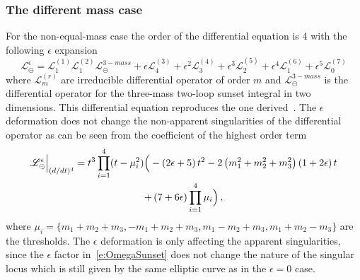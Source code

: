 \documentclass[a4paper,12pt]{article}
\numberwithin{equation}{section}
\numberwithin{figure}{section}
\def\su{\circleddash}
\begin{document}
\subsubsection{The different mass case}\label{sec:2sunset3mass}

For the non-equal-mass case the order of the differential equation is
4 with the following $\epsilon$ expansion
\begin{equation}
     \mathscr{L}^{\epsilon}_\su =   \mathscr{L}^{(1)}_1
     \mathscr{L}^{(2)}_1    \mathscr{L}^{3-mass}_\su +\epsilon
     \mathscr{L}^{(3)}_4+\epsilon^2  \mathscr{L}^{(4)}_3+\epsilon^3
     \mathscr{L}^{(5)}_2+ \epsilon^4 \mathscr{L}^{(6)}_1 +\epsilon^5
    \mathscr{L}^{(7)}_0
   \end{equation} 
   where $ \mathscr{L}^{(r)}_m$  are irreducible differential operator
   of  order $m$ and $\mathscr{L}^{3-mass}_\su$ is the differential
   operator for the three-mass two-loop sunset integral in two
   dimensions. This differential equation reproduces the one 
   derived~\cite{Remiddi:2013joa,Remiddi:2016gno}.
%
The $\epsilon$ deformation does not change the non-apparent
singularities of the differential operator as can be seen from the
coefficient of the highest order term
\begin{multline}
  \mathscr{L}^{\epsilon}_\su \Big\vert_{(d/dt)^4}= t^3\prod_{i=1}^4 (t-
  \mu_i^2) \Big(-\left(2 \epsilon +5\right) t^{2}-2
    \left(m_{1}^{2}+m_{2}^{2}+m_{3}^{2}\right) \left(1+2 \epsilon
    \right) t \cr+ \left(7+6 \epsilon \right)\prod_{i=1}^4 \mu_i
\Big)  \, , 
\end{multline}
where $\mu_i=\{m_1+m_2+m_3,-m_1+m_2+m_3,m_1-m_2+m_3,m_1+m_2-m_3\}$ are
the thresholds.  The $\epsilon$ deformation is only affecting the
apparent singularities, since the $\epsilon$ factor
in~\eqref{e:OmegaSunset} does not change the nature of the singular
locus which is still given by the same elliptic curve as in the
$\epsilon=0$ case.
   
\end{document}
